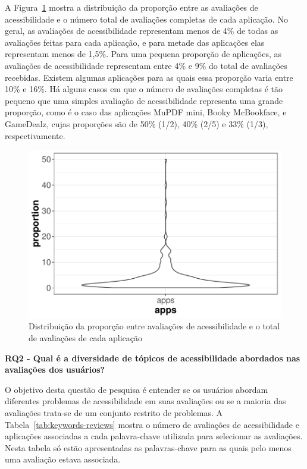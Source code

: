 A Figura~\ref{fig:distribution-proportion} mostra a distribuição da proporção entre as avaliações de acessibilidade e o número total de avaliações completas de cada aplicação.
No geral, as avaliações de acessibilidade representam menos de 4\% de todas as avaliações feitas para cada aplicação, e para metade das aplicações elas representam menos de 1,5\%.
Para uma pequena proporção de aplicações, as avaliações de acessibilidade representam entre 4\% e 9\% do total de avaliações recebidas. Existem algumas aplicações para as quais essa proporção varia entre 10\% e 16\%.
Há alguns casos em que o número de avaliações completas é tão pequeno que uma simples avaliação de acessibilidade representa uma grande proporção, como é o caso das aplicações MuPDF mini, Booky McBookface, e GameDealz, cujas proporções são de 50\% (1/2), 40\% (2/5) e 33\% (1/3), respectivamente. 
\newline 

\begin{figure}[!htb]
\centering
\includegraphics[scale=0.8]{imagens/distribution-proportion-accreviews}
\caption{Distribuição da proporção entre avaliações de acessibilidade e o total de avaliações de cada aplicação}
\label{fig:distribution-proportion}
\end{figure}


\textbf{RQ2 - Qual é a diversidade de tópicos de acessibilidade abordados nas avaliações dos usuários?}

O objetivo desta questão de pesquisa é entender se os usuários abordam diferentes problemas de acessibilidade em suas avaliações ou se a maioria das avaliações trata-se de um conjunto restrito de problemas. 
A Tabela~\ref{tab:keywords-reviews} mostra o número de avaliações de acessibilidade e aplicações associadas a cada palavra-chave utilizada para selecionar as avaliações. 
Nesta tabela só estão apresentadas as palavras-chave para as quais pelo menos uma avaliação estava associada. 

